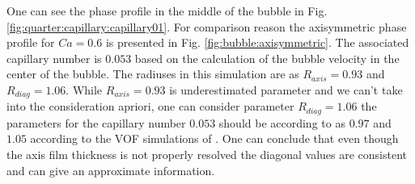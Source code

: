 \documentclass{article}
\begin{document}
One can see the phase profile in the middle of the bubble in
Fig.\ref{fig:quarter:capillary:capillary01}. For comparison reason the axisymmetric phase profile
for $Ca=0.6$ is presented in Fig. \ref{fig:bubble:axisymmetric}. The associated capillary number is
$0.053$ based on
the calculation of the bubble velocity in the center of the bubble. The radiuses in this simulation
are as $R_{axis}=0.93$ and $R_{diag}=1.06$. While $R_{axis}=0.93$ is underestimated parameter and
we can't take into the consideration apriori, one can consider parameter $R_{diag}=1.06$ the
parameters for the capillary number $0.053$ should be according to \citet{heil-threedim} as $0.97$
and $1.05$ according to the VOF simulations of \citet{wang-non-circular}. One can conclude that
even though the axis film thickness is not properly resolved the diagonal values are consistent and
can give an approximate information. 
\end{document}
